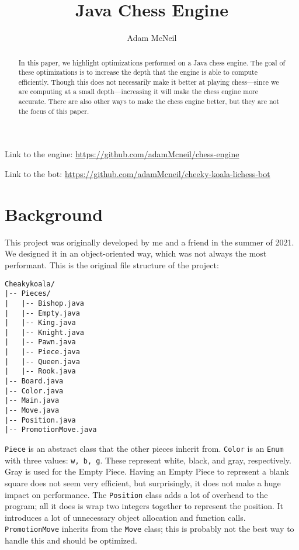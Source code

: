 \documentclass[sigconf]{acmart}
\begin{document}
\title{Java Chess Engine}

\author{Adam McNeil}

\begin{abstract}
In this paper, we highlight optimizations performed on a Java chess engine.
The goal of these optimizations is to increase the depth that the engine is able to compute efficiently.
Though this does not necessarily make it better at playing chess—since we are computing at a small depth—increasing it will make the chess engine more accurate.
There are also other ways to make the chess engine better, but they are not the focus of this paper.
\end{abstract}

\maketitle
Link to the engine: \url{https://github.com/adamMcneil/chess-engine}

Link to the bot: \url{https://github.com/adamMcneil/cheeky-koala-lichess-bot}

\section{Background}
This project was originally developed by me and a friend in the summer of 2021.
We designed it in an object-oriented way, which was not always the most performant.
This is the original file structure of the project:
\begin{verbatim}
Cheakykoala/
|-- Pieces/
|   |-- Bishop.java
|   |-- Empty.java
|   |-- King.java
|   |-- Knight.java
|   |-- Pawn.java
|   |-- Piece.java
|   |-- Queen.java
|   |-- Rook.java
|-- Board.java
|-- Color.java
|-- Main.java
|-- Move.java
|-- Position.java
|-- PromotionMove.java
\end{verbatim}
\texttt{Piece} is an abstract class that the other pieces inherit from.
\texttt{Color} is an \texttt{Enum} with three values: \texttt{w, b, g}.
These represent white, black, and gray, respectively.
Gray is used for the Empty Piece. Having an Empty Piece to represent a blank square does not seem very efficient, but surprisingly, it does not make a huge impact on performance.
The \texttt{Position} class adds a lot of overhead to the program; all it does is wrap two integers together to represent the position.
It introduces a lot of unnecessary object allocation and function calls.
\texttt{PromotionMove} inherits from the \texttt{Move} class; this is probably not the best way to handle this and should be optimized.
\end{document}
